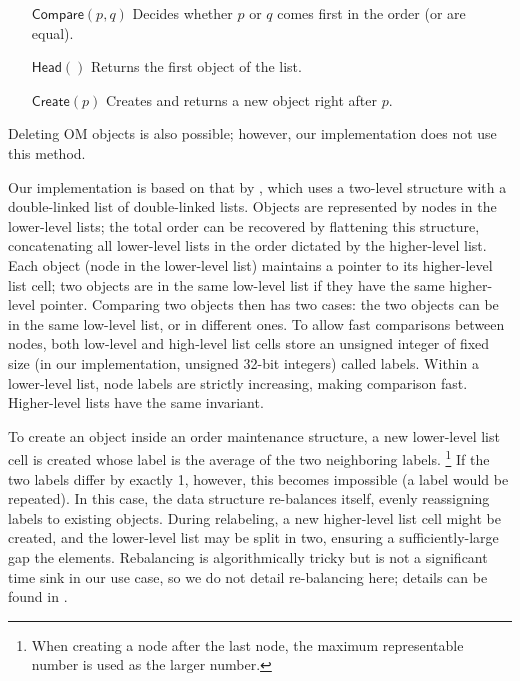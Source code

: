 \begin{enumerate}
\setlength{\itemindent}{8em}
  
\item[$\mathsf{Compare}(p, q)$] Decides whether $p$ or $q$ comes first in the order (or are equal).
\item[$\mathsf{Head}()$] Returns the first object of the list.
\item[$\mathsf{Create}(p)$] Creates and returns a new object right after $p$.
\end{enumerate}

\noindent
Deleting OM objects is also possible; however,
  our implementation does not use this method.

Our implementation is based on that by \citet{SOM},
  which uses a two-level structure with
  a double-linked list of double-linked lists.
Objects are represented by nodes in the lower-level lists;
  the total order can be recovered by flattening this structure,
  concatenating all lower-level lists
  in the order dictated by the higher-level list.
Each object (node in the lower-level list)
  maintains a pointer to its higher-level list cell;
  two objects are in the same low-level list
  if they have the same higher-level pointer.
Comparing two objects then has two cases:
  the two objects can be in the same low-level list,
  or in different ones.
To allow fast comparisons between nodes,
  both low-level and high-level list cells store
  an unsigned integer of fixed size
  (in our implementation, unsigned 32-bit integers)
  called labels.
Within a lower-level list,
  node labels are strictly increasing,
  making comparison fast.
Higher-level lists have the same invariant.

To create an object inside an order maintenance structure,
  a new lower-level list cell is created
  whose label is the average of the two neighboring labels.
\footnote{
  When creating a node after the last node,
  the maximum representable number is used as the larger number.
}
If the two labels differ by exactly 1, however,
  this becomes impossible (a label would be repeated).
In this case, the data structure re-balances itself,
  evenly reassigning labels to existing objects.
During relabeling, a new higher-level list cell might be created,
  and the lower-level list may be split in two,
  ensuring a sufficiently-large gap the elements.
Rebalancing is algorithmically tricky
  but is not a significant time sink in our use case,
  so we do not detail re-balancing here;
  details can be found in \citet{SOM}.

